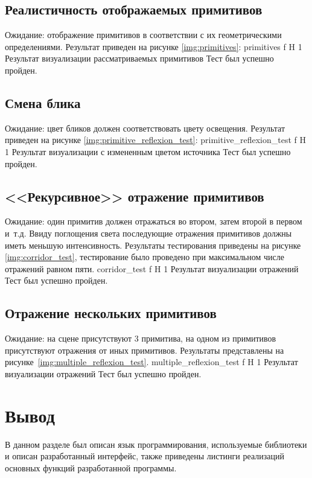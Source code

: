 \subsection{Реалистичность отображаемых примитивов}
Ожидание: отображение примитивов  в соответствии с их геометрическими определениями.
Результат приведен на рисунке \ref{img:primitives}:
{primitives} %
{f} %
{H} %
{1\textwidth} %
{Результат визуализации рассматриваемых примитивов} %
Тест был успешно пройден.



\subsection{Смена блика}
Ожидание: цвет бликов должен соответствовать цвету освещения.
Результат приведен на рисунке \ref{img:primitive_reflexion_test}:
{primitive_reflexion_test} %
{f} %
{H} %
{1\textwidth} %
{Результат визуализации с измененным цветом источника} %
Тест был успешно пройден.

\subsection{<<Рекурсивное>> отражение примитивов}
Ожидание: один примитив должен отражаться во втором, затем второй в первом и~т.д. Ввиду поглощения света последующие отражения примитивов должны иметь меньшую интенсивность. Результаты тестирования приведены на рисунке \ref{img:corridor_test}, тестирование было проведено при максимальном числе отражений равном пяти.
{corridor_test} %
{f} %
{H} %
{1\textwidth} %
{Результат визуализации отражений} %
Тест был успешно пройден.

\subsection{Отражение нескольких примитивов}
Ожидание: на сцене присутствуют 3 примитива, на одном из примитивов  присутствуют отражения от иных примитивов. Результаты представлены на рисунке~\ref{img:multiple_reflexion_test}.
{multiple_reflexion_test} %
{f} %
{H} %
{1\textwidth} %
{Результат визуализации отражений} %
Тест был успешно пройден.

\section*{Вывод}

В данном разделе был описан язык программирования, используемые библиотеки и описан разработанный интерфейс, также приведены листинги реализаций основных функций разработанной программы.









